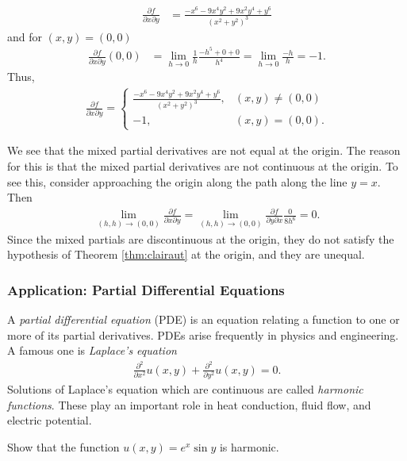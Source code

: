 \documentclass[12pt,letterpaper,reqno]{article}
\numberwithin{equation}{section}
\begin{document}
{\begin{example}
\begin{align*}
	\frac{\partial f}{\partial x \partial y}&=\frac{-x^6-9x^4y^2+9x^2y^4+y^6}{(x^2+y^2)^3}
\end{align*} 
and for $(x,y)=(0,0)$
\begin{align*}
	\frac{\partial f}{\partial x \partial y}(0,0)&=\lim_{h \to 0}\frac{1}{h}\frac{-h^5+0+0}{h^4}=\lim_{h \to 0}\frac{-h}{h}=-1. 
\end{align*}
Thus,
\begin{align*}
	\frac{\partial f}{\partial x \partial y}=\begin{cases}
		\frac{-x^6-9x^4y^2+9x^2y^4+y^6}{(x^2+y^2)^3}, &(x,y) \neq (0,0) \\
		-1, &(x,y)=(0,0).
	\end{cases}
\end{align*}

We see that the mixed partial derivatives are not equal at the origin. The reason for this is that the mixed partial derivatives are not continuous at the origin. To see this, consider approaching the origin along the path along the line $y=x$. Then
\begin{align*}
	\lim_{(h,h) \to (0,0)}\frac{\partial f}{\partial x \partial y}=\lim_{(h,h) \to (0,0)}\frac{\partial f}{\partial y \partial x}\frac{0}{8h^6}=0.
\end{align*}
Since the mixed partials are discontinuous at the origin, they do not satisfy the hypothesis of Theorem \ref{thm:clairaut} at the origin, and they are unequal.
\end{example}


\subsubsection{Application: Partial Differential Equations}
A \emph{partial differential equation} (PDE) is an equation relating a function to one or more of its partial derivatives. PDEs arise frequently in physics and engineering. A famous one is \emph{Laplace's equation}
\begin{align*}
	\frac{\partial^2}{\partial x^2}u(x,y)+\frac{\partial^2}{\partial y^2}u(x,y)=0.
\end{align*}
Solutions of Laplace's equation which are continuous are called \emph{harmonic functions}. These play an important role in heat conduction, fluid flow, and electric potential.

\begin{exercise}
Show that the function $u(x,y)=e^x\sin y$ is harmonic.	
\end{exercise}

}
\end{document}
